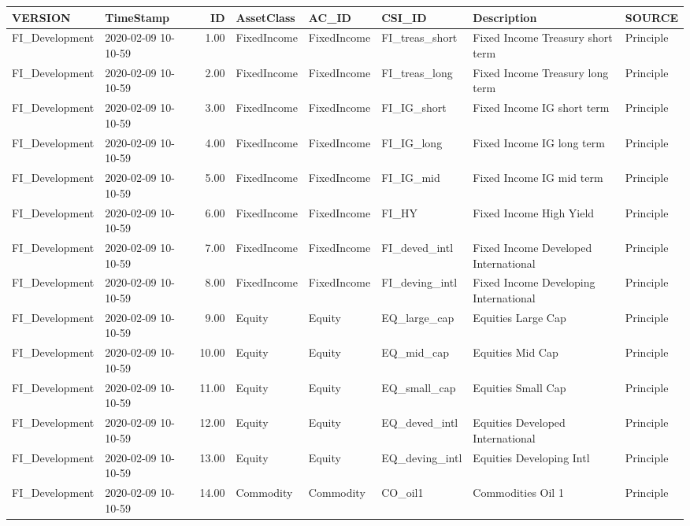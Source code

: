 \begin{longtable}{llrlllll}
  \hline
VERSION & TimeStamp & ID & AssetClass & AC\_ID & CSI\_ID & Description & SOURCE \\ 
  \hline
FI\_Development & 2020-02-09 10-10-59 & 1.00 & FixedIncome & FixedIncome & FI\_treas\_short & Fixed Income Treasury short term & Principle \\ 
  FI\_Development & 2020-02-09 10-10-59 & 2.00 & FixedIncome & FixedIncome & FI\_treas\_long & Fixed Income Treasury long term & Principle \\ 
  FI\_Development & 2020-02-09 10-10-59 & 3.00 & FixedIncome & FixedIncome & FI\_IG\_short & Fixed Income IG short term & Principle \\ 
  FI\_Development & 2020-02-09 10-10-59 & 4.00 & FixedIncome & FixedIncome & FI\_IG\_long & Fixed Income IG long term & Principle \\ 
  FI\_Development & 2020-02-09 10-10-59 & 5.00 & FixedIncome & FixedIncome & FI\_IG\_mid & Fixed Income IG mid term & Principle \\ 
  FI\_Development & 2020-02-09 10-10-59 & 6.00 & FixedIncome & FixedIncome & FI\_HY & Fixed Income High Yield & Principle \\ 
  FI\_Development & 2020-02-09 10-10-59 & 7.00 & FixedIncome & FixedIncome & FI\_deved\_intl & Fixed Income Developed International & Principle \\ 
  FI\_Development & 2020-02-09 10-10-59 & 8.00 & FixedIncome & FixedIncome & FI\_deving\_intl & Fixed Income Developing International & Principle \\ 
  FI\_Development & 2020-02-09 10-10-59 & 9.00 & Equity & Equity & EQ\_large\_cap & Equities Large Cap & Principle \\ 
  FI\_Development & 2020-02-09 10-10-59 & 10.00 & Equity & Equity & EQ\_mid\_cap & Equities Mid Cap & Principle \\ 
  FI\_Development & 2020-02-09 10-10-59 & 11.00 & Equity & Equity & EQ\_small\_cap & Equities Small Cap & Principle \\ 
  FI\_Development & 2020-02-09 10-10-59 & 12.00 & Equity & Equity & EQ\_deved\_intl & Equities Developed International & Principle \\ 
  FI\_Development & 2020-02-09 10-10-59 & 13.00 & Equity & Equity & EQ\_deving\_intl & Equities Developing Intl & Principle \\ 
  FI\_Development & 2020-02-09 10-10-59 & 14.00 & Commodity & Commodity & CO\_oil1 & Commodities Oil 1 & Principle \\ 

\end{longtable}
